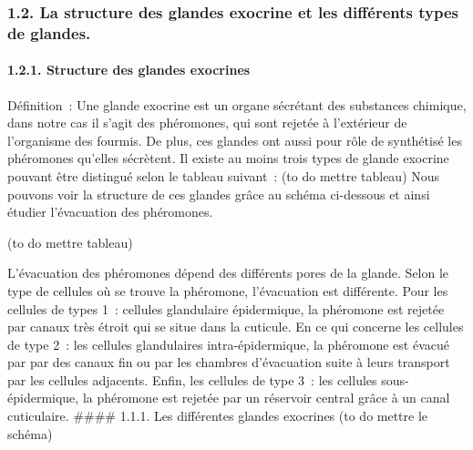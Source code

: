 \subsubsection{1.2. La structure des glandes exocrine et les différents
types de
glandes.}\label{la-structure-des-glandes-exocrine-et-les-diffuxe9rents-types-de-glandes.}

\paragraph{1.2.1. Structure des glandes
exocrines}\label{structure-des-glandes-exocrines}

Définition~: Une glande exocrine est un organe sécrétant des substances
chimique, dans notre cas il s'agit des phéromones, qui sont rejetée à
l'extérieur de l'organisme des fourmis. De plus, ces glandes ont aussi
pour rôle de synthétisé les phéromones qu'elles sécrètent. Il existe au
moins trois types de glande exocrine pouvant être distingué selon le
tableau suivant~: (to do mettre tableau) Nous pouvons voir la structure
de ces glandes grâce au schéma ci-dessous et ainsi étudier l'évacuation
des phéromones.

(to do mettre tableau)

L'évacuation des phéromones dépend des différents pores de la glande.
Selon le type de cellules où se trouve la phéromone, l'évacuation est
différente. Pour les cellules de types 1~: cellules glandulaire
épidermique, la phéromone est rejetée par canaux très étroit qui se
situe dans la cuticule. En ce qui concerne les cellules de type 2~: les
cellules glandulaires intra-épidermique, la phéromone est évacué par par
des canaux fin ou par les chambres d'évacuation suite à leurs transport
par les cellules adjacents. Enfin, les cellules de type 3~: les cellules
sous-épidermique, la phéromone est rejetée par un réservoir central
grâce à un canal cuticulaire. \#\#\#\# 1.1.1. Les différentes glandes
exocrines (to do mettre le schéma)

